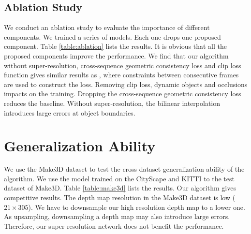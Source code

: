 \documentclass[10pt,twocolumn,letterpaper]{article}
\begin{document}
\subsection{Ablation Study}
We conduct an ablation study to evaluate the importance of different components. We trained a series of models. Each one drops one proposed component.  Table \ref{table:ablation} lists the results. It is obvious that all the proposed components improve the performance. We find that our algorithm without super-resolution, cross-sequence geometric consistency loss and clip loss function gives similar results as \cite{yin2018geonet}, where constraints between consecutive frames are used to construct the loss. Removing clip loss, dynamic objects and occlusions  impacts on the training. Dropping the cross-sequence geometric consistency loss reduces the baseline. Without super-resolution, the bilinear interpolation  introduces large errors at object boundaries. 



\section{Generalization Ability}
We use the Make3D dataset \cite{saxena2009make3d} to test the cross dataset generalization ability of the algorithm. We use the model trained on the CityScape and KITTI to the test dataset of Make3D. Table \ref{table:make3d} lists the results. Our algorithm gives competitive results. The depth map resolution in the  Make3D dataset is low ($ 21 \times 305 $).  We have to downsample our high resolution depth map to a lower one. As upsampling, downsampling a depth map may also introduce large errors. Therefore, our super-resolution network does not benefit the performance. 
\end{document}
